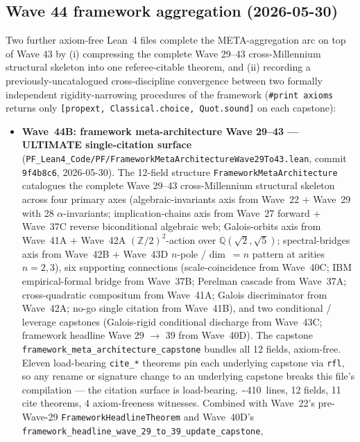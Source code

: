 \subsection{Wave 44 framework aggregation (2026-05-30)}
\label{subsec:wave44-aggregation}

Two further axiom-free Lean~4 files complete the META-aggregation
arc on top of Wave 43 by (i) compressing the complete Wave 29--43
cross-Millennium structural skeleton into one referee-citable
theorem, and (ii) recording a previously-uncatalogued cross-discipline
convergence between two formally independent rigidity-narrowing
procedures of the framework (\texttt{\#print axioms} returns only
\texttt{[propext, Classical.choice, Quot.sound]} on each capstone):

\begin{itemize}
\item \textbf{Wave~44B: framework meta-architecture Wave 29--43 ---
  ULTIMATE single-citation surface}
  (\texttt{PF\_Lean4\_Code/PF/FrameworkMetaArchitectureWave29To43.lean},
  commit \texttt{9f4b8c6}, 2026-05-30). The 12-field structure
  \texttt{FrameworkMetaArchitecture} catalogues the complete Wave
  29--43 cross-Millennium structural skeleton across four primary
  axes (algebraic-invariants axis from Wave~22 $+$ Wave~29 with 28
  $\alpha$-invariants; implication-chains axis from Wave~27 forward
  $+$ Wave~37C reverse biconditional algebraic web; Galois-orbits
  axis from Wave~41A $+$ Wave~42A $(\mathbb{Z}/2)^2$-action over
  $\mathbb{Q}(\sqrt{2}, \sqrt{5})$; spectral-bridges axis from
  Wave~42B $+$ Wave~43D $n$-pole / dim~$=n$ pattern at arities
  $n = 2, 3$), six supporting connections (scale-coincidence from
  Wave~40C; IBM empirical-formal bridge from Wave~37B; Perelman
  cascade from Wave~37A; cross-quadratic compositum from Wave~41A;
  Galois discriminator from Wave~42A; no-go single citation from
  Wave~41B), and two conditional / leverage capstones (Galois-rigid
  conditional discharge from Wave~43C; framework headline Wave 29
  $\to$ 39 from Wave~40D). The capstone
  \texttt{framework\_meta\_architecture\_capstone} bundles all 12
  fields, axiom-free. Eleven load-bearing \texttt{cite\_*} theorems
  pin each underlying capstone via \texttt{rfl}, so any rename or
  signature change to an underlying capstone breaks this file's
  compilation --- the citation surface is load-bearing.
  \textasciitilde 410~lines, 12 fields, 11 cite theorems, 4
  axiom-freeness witnesses. Combined with Wave~22's pre-Wave-29
  \texttt{FrameworkHeadlineTheorem} and Wave~40D's
  \texttt{framework\_headline\_wave\_29\_to\_39\_update\_capstone},

\end{itemize}
